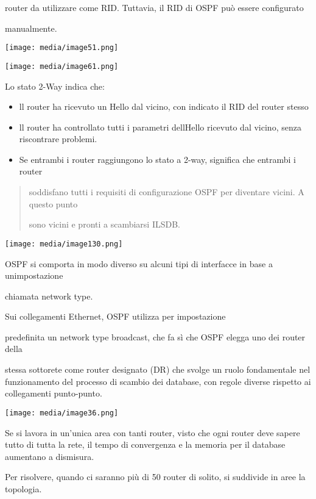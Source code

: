 router da utilizzare come RID. Tuttavia, il RID di OSPF può essere
configurato

manualmente.

\texttt{[image: media/image51.png]}

\texttt{[image: media/image61.png]}

Lo stato 2-Way indica che:

\begin{itemize}
\item
  ll router ha ricevuto un Hello dal vicino, con indicato il RID del
  router stesso
\item
  ll router ha controllato tutti i parametri dell\textquotesingle Hello
  ricevuto dal vicino, senza riscontrare problemi.
\item
  Se entrambi i router raggiungono lo stato a 2-way, significa che
  entrambi i router
\end{itemize}

\begin{quote}
soddisfano tutti i requisiti di configurazione OSPF per diventare
vicini. A questo punto

sono vicini e pronti a scambiarsi I\textquotesingle LSDB.
\end{quote}

\texttt{[image: media/image130.png]}

OSPF si comporta in modo diverso su alcuni tipi di interfacce in base a
un\textquotesingle impostazione

chiamata network type.

Sui collegamenti Ethernet, OSPF utilizza per impostazione

predefinita un network type broadcast, che fa sì che OSPF elegga uno dei
router della

stessa sottorete come router designato (DR) che svolge un ruolo
fondamentale nel funzionamento del processo di scambio dei database, con
regole diverse rispetto ai collegamenti punto-punto.

\texttt{[image: media/image36.png]}

Se si lavora in un'unica area con tanti router, visto che ogni router
deve sapere tutto di tutta la rete, il tempo di convergenza e la memoria
per il database aumentano a dismisura.

Per risolvere, quando ci saranno più di 50 router di solito, si
suddivide in aree la topologia.


